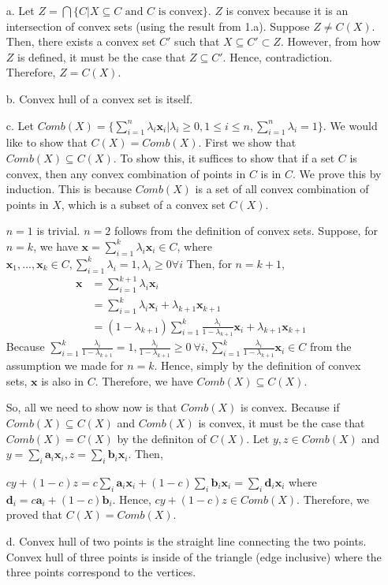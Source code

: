 \documentclass[11pt]{article}
\newcommand{\bx}{\mathbf{x}}
\newcommand{\bd}{\mathbf{d}}
\newcommand{\ba}{\mathbf{a}}
\begin{document}
\color{blue}
\begin{itemize}
\item [a.] Let $Z = \bigcap \{C| \text{$X \subseteq C$ and $C$ is convex}\}$. $Z$ is convex because it is an intersection of convex sets (using the result from 1.a). Suppose $Z \neq C(X)$. Then, there exists a convex set $C'$ such that $X \subseteq C' \subset Z$. However, from how $Z$ is defined, it must be the case that $Z \subseteq C'$. Hence, contradiction. Therefore, $Z=C(X)$.
\item [b.] Convex hull of a convex set is itself.
\item [c.] Let $Comb(X) = \{\sum_{i=1}^n \lambda_i \bx_i | \lambda_i \geq 0, 1 \leq i \leq n, \sum_{i=1}^n \lambda_i = 1 \}$. We would like to show that $C(X)=Comb(X)$. First we show that $Comb(X) \subseteq C(X)$. To show this, it suffices to show that if a set $C$ is convex, then any convex combination of points in $C$ is in $C$. We prove this by induction. This is because  $Comb(X)$ is a set of all convex combination of points in $X$, which is a subset of a convex set $C(X)$.

$n=1$ is trivial. $n=2$ follows from the definition of convex sets.
Suppose, for $n=k$, we have $\bx = \sum_{i=1}^k \lambda_i \bx_i \in C$, where $\bx_1, ..., \bx_k \in C, \sum_{i=1}^k \lambda_i = 1, \lambda_i \geq 0 \forall i$ 
Then, for $n=k+1$, 
\begin{align*}
\bx &= \sum_{i=1}^{k+1} \lambda_i \bx_i &\\
&= \sum_{i=1}^k \lambda_i \bx_i + \lambda_{k+1} \bx_{k+1} &\\
&= (1 - \lambda_{k+1}) \sum_{i=1}^k \frac{\lambda_i}{1-\lambda_{k+1}}\bx_i + \lambda_{k+1} \bx_{k+1} 
\end{align*}
Because $\sum_{i=1}^k \frac{\lambda_i}{1-\lambda_{k+1}} = 1, \frac{\lambda_i}{1-\lambda_{k+1}} \geq 0 \ \forall i, \sum_{i=1}^k \frac{\lambda_i}{1-\lambda_{k+1}} \bx_i \in C$ from the assumption we made for $n=k$.
Hence, simply by the definition of convex sets, $\bx$ is also in $C$. Therefore, we have $Comb(X) \subseteq C(X)$.

So, all we need to show now is that $Comb(X)$ is convex. Because if $Comb(X) \subseteq C(X)$ and $Comb(X)$ is convex, it must be the case that $Comb(X)=C(X)$ by the definiton of $C(X)$.
Let $y,z \in Comb(X)$ and $y=\sum_i \ba_i \bx_i, z=\sum_i \textbf{b}_i \bx_i$. Then,

$cy+(1-c)z = c\sum_i \ba_i \bx_i + (1-c) \sum_i \textbf{b}_i \bx_i = \sum_i \bd_i \bx_i$ where $\bd_i = c\ba_i + (1-c) \textbf{b}_i$.
Hence, $c y + (1-c) z \in Comb(X)$.
Therefore, we proved that $C(X)=Comb(X)$.


\item [d.] Convex hull of two points is the straight line connecting the two points. Convex hull of three points is inside of the triangle (edge inclusive) where the three points correspond to the vertices.
\end{itemize}
\color{black}
\end{document}
